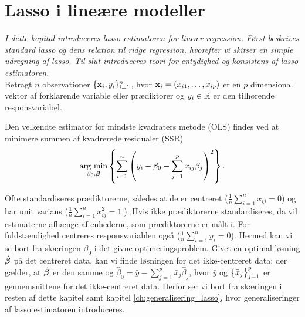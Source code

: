 \chapter{Lasso i lineære modeller}
\textit{I dette kapital introduceres lasso estimatoren for lineær regression. 
Først beskrives standard lasso og dens relation til ridge regression, hvorefter vi skitser en simple udregning af lasso.
Til slut introduceres teori for entydighed og konsistens af lasso estimatoren.} \\[4mm]
%
Betragt \(n\) observationer \(\{\mathbf{x}_i, y_i\}_{i=1}^n \), hvor $\mathbf{x}_i=(x_{i1}, \ldots, x_{ip})$ er en $p$ dimensional vektor af forklarende variable eller prædiktorer og $y_i \in \mathbb{R}$ er den tilhørende responsvariabel.

Den velkendte estimator for mindste kvadraters metode (OLS) findes ved at minimere summen af kvadrerede residualer (SSR)
\begin{align}
\argmin_{\beta_0, \tbeta} \cbr{\sum_{i=1}^n \del{y_i - \beta_0 - \sum_{j=1}^p x_{ij} \beta_j}^2}. \label{eq:OLS}
\end{align}

Ofte standardiseres prædiktorerne, således at de er centreret (\(\frac{1}{n} \sum_{i=1}^n x_{ij} = 0\)) og har unit varians (\(\frac{1}{n} \sum_{i=1}^n x_{ij}^2=1\).).
Hvis ikke prædiktorerne standardiseres, da vil estimaterne afhænge af enhederne, som prædiktorerne er målt i.
For fuldstændighed centreres responsvariablen også (\(\frac{1}{n} \sum_{i=1}^n y_{i} = 0\)).
Hermed kan vi se bort fra skæringen $\beta_0$ i det givne optimeringsproblem.
Givet en optimal løsning \(\hat{\boldsymbol{\beta}}\) på det centreret data, kan vi finde løsningen for det ikke-centreret data: der gælder, at \(\hat{\boldsymbol{\beta}}\) er den samme og 
\(\hat{\beta}_0 = \bar{y} - \sum_{j=1}^p \bar{x}_j \hat{\beta}_j\), hvor \(\bar{y}\) og \(\cbr{\bar{x}_j}_{j=1}^p\) er gennemsnittene for det ikke-centreret data.
Derfor ser vi bort fra skæringen i resten af dette kapitel samt kapitel \ref{ch:generalisering_lasso}, hvor generaliseringer af lasso estimatoren introduceres.

